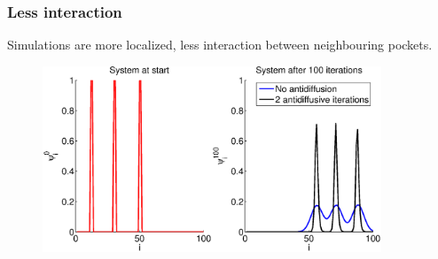 \documentclass[hyperref={pdfstartview=Fit}]{beamer}
\newcommand{\imsize}{}
\begin{document}
\begin{frame}

\frametitle{Less interaction}
Simulations are more localized, less interaction between neighbouring pockets.

\begin{figure}
\renewcommand{\imsize}{0.9\textwidth}
\includegraphics[width=\imsize]{animation/peaks}%
\end{figure}
\end{frame}
\end{document}
